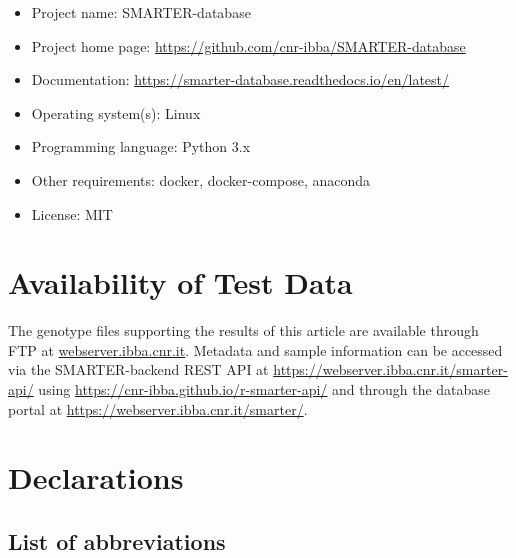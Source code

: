 \documentclass[a4paper,num-refs,gigabyte]{oup-contemporary}
\begin{document}
\begin{itemize}
\item Project name: SMARTER-database
\item Project home page: \url{https://github.com/cnr-ibba/SMARTER-database}
\item Documentation: \url{https://smarter-database.readthedocs.io/en/latest/}
\item Operating system(s): Linux
\item Programming language: Python 3.x
\item Other requirements: docker, docker-compose, anaconda
\item License: MIT
\end{itemize}

\section{Availability of Test Data}

The genotype files supporting the results of this article are available through FTP at \url{webserver.ibba.cnr.it}. Metadata and sample information can be accessed via the SMARTER-backend REST API at \url{https://webserver.ibba.cnr.it/smarter-api/} using \url{https://cnr-ibba.github.io/r-smarter-api/} and through the database portal at \url{https://webserver.ibba.cnr.it/smarter/}.

\section{Declarations}

\subsection{List of abbreviations}
\end{document}
